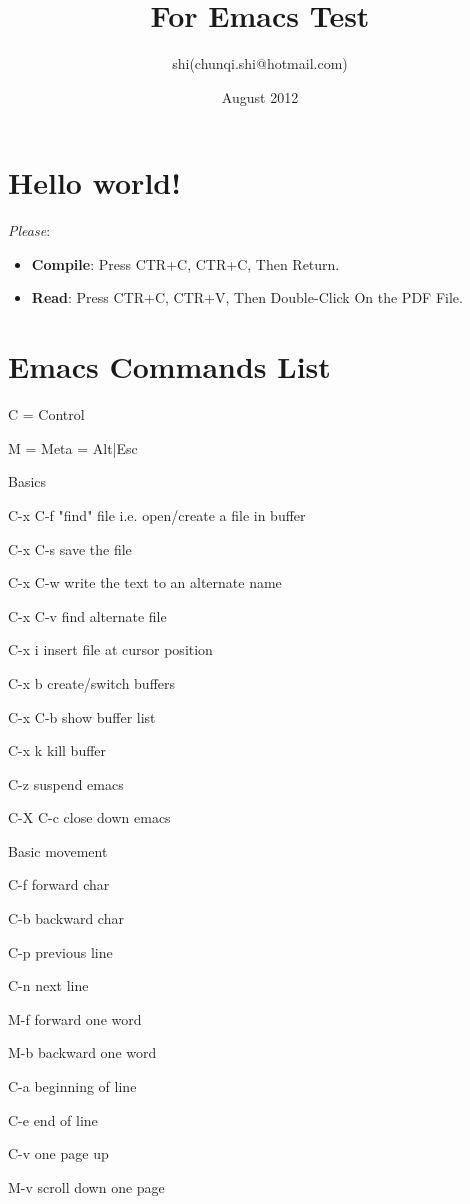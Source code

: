 \documentclass{article}
\title{For Emacs Test}
\author{shi(chunqi.shi@hotmail.com)}
\date{August 2012}
\begin{document}
   
\maketitle
\section{Hello world!}
\emph{Please}:
\begin{itemize}
\item  \textbf{Compile}: Press CTR+C, CTR+C,  Then Return.
\item  \textbf{Read}:    Press CTR+C, CTR+V,  Then Double-Click On the PDF File. 
\end{itemize}

\section{Emacs Commands List} 



C = Control


M = Meta = Alt|Esc



Basics


C-x C-f "find" file i.e. open/create a file in buffer


C-x C-s save the file


C-x C-w write the text to an alternate name


C-x C-v find alternate file


C-x i insert file at cursor position


C-x b create/switch buffers


C-x C-b show buffer list


C-x k kill buffer


C-z suspend emacs 


C-X C-c close down emacs



Basic movement


C-f forward char


C-b backward char


C-p previous line


C-n next line


M-f forward one word


M-b backward one word


C-a beginning of line


C-e end of line


C-v one page up


M-v scroll down one page
\end{document}
